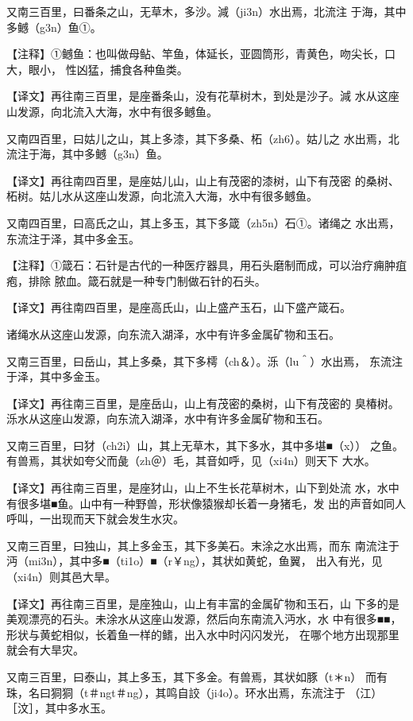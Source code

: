\documentclass[a4paper,12pt,UTF8,twoside]{ctexbook}
\begin{document}
又南三百里，曰番条之山，无草木，多沙。減（ji3n）水出焉，北流注 于海，其中多鳡（g3n）鱼①。

【注释】①鳡鱼：也叫做母鲇、竿鱼，体延长，亚圆筒形，青黄色，吻尖长，口大，眼小， 性凶猛，捕食各种鱼类。

【译文】再往南三百里，是座番条山，没有花草树木，到处是沙子。減 水从这座山发源，向北流入大海，水中有很多鳡鱼。

又南四百里，曰姑儿之山，其上多漆，其下多桑、柘（zh6）。姑儿之 水出焉，北流注于海，其中多鳡（g3n）鱼。

【译文】再往南四百里，是座姑儿山，山上有茂密的漆树，山下有茂密 的桑树、柘树。姑儿水从这座山发源，向北流入大海，水中有很多鳡鱼。

又南四百里，曰高氏之山，其上多玉，其下多箴（zh5n）石①。诸绳之 水出焉，东流注于泽，其中多金玉。

【注释】①箴石：石针是古代的一种医疗器具，用石头磨制而成，可以治疗痈肿疽疱，排除 脓血。箴石就是一种专门制做石针的石头。

【译文】再往南四百里，是座高氏山，山上盛产玉石，山下盛产箴石。

诸绳水从这座山发源，向东流入湖泽，水中有许多金属矿物和玉石。

又南三百里，曰岳山，其上多桑，其下多樗（ch＆）。泺（lu＾）水出焉， 东流注于泽，其中多金玉。

【译文】再往南三百里，是座岳山，山上有茂密的桑树，山下有茂密的 臭椿树。泺水从这座山发源，向东流入湖泽，水中有许多金属矿物和玉石。

又南三百里，曰犲（ch2i）山，其上无草木，其下多水，其中多堪■（x）） 之鱼。有兽焉，其状如夸父而彘（zh＠）毛，其音如呼，见（xi4n）则天下 大水。

【译文】再往南三百里，是座犲山，山上不生长花草树木，山下到处流 水，水中有很多堪■鱼。山中有一种野兽，形状像猿猴却长着一身猪毛，发 出的声音如同人呼叫，一出现而天下就会发生水灾。

又南三百里，曰独山，其上多金玉，其下多美石。末涂之水出焉，而东 南流注于沔（mi3n），其中多■（ti1o）■（r￥ng），其状如黄蛇，鱼翼， 出入有光，见（xi4n）则其邑大旱。

【译文】再往南三百里，是座独山，山上有丰富的金属矿物和玉石，山 下多的是美观漂亮的石头。未涂水从这座山发源，然后向东南流入沔水，水 中有很多■■，形状与黄蛇相似，长着鱼一样的鳍，出入水中时闪闪发光， 在哪个地方出现那里就会有大旱灾。

又南三百里，曰泰山，其上多玉，其下多金。有兽焉，其状如豚（t＊n） 而有珠，名曰狪狪（t＃ngt＃ng），其鸣自詨（ji4o）。环水出焉，东流注于 （江）［汶］，其中多水玉。
\end{document}
